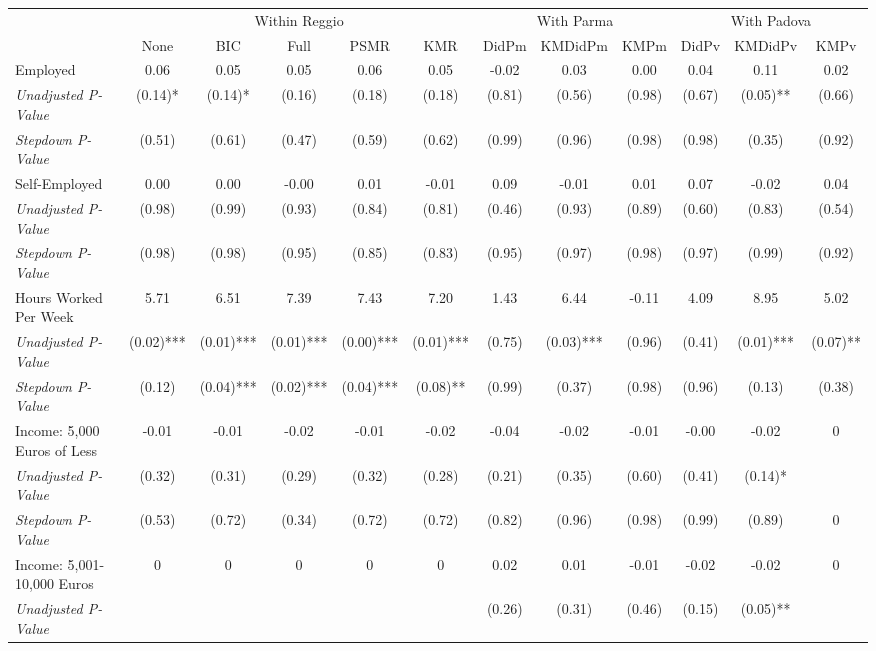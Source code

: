 \begin{tabular}{l c c c c c c c c c c c}
\toprule
& \multicolumn{5}{c}{Within Reggio} & \multicolumn{3}{c}{With Parma} & \multicolumn{3}{c}{With Padova} \\\cmidrule(lr){2-6} \cmidrule(lr){7-9} \cmidrule(lr){10-12}
 & None & BIC & Full & PSMR & KMR & DidPm & KMDidPm & KMPm & DidPv & KMDidPv & KMPv \\
\midrule
Employed & 0.06 & 0.05 & 0.05 & 0.06 & 0.05 & -0.02 & 0.03 & 0.00 & 0.04 & 0.11 & 0.02 \\
\quad \textit{Unadjusted P-Value} & (0.14)* & (0.14)* & (0.16) & (0.18) & (0.18) & (0.81) & (0.56) & (0.98) & (0.67) & (0.05)** & (0.66) \\
\quad \textit{Stepdown P-Value} & (0.51) & (0.61) & (0.47) & (0.59) & (0.62) & (0.99) & (0.96) & (0.98) & (0.98) & (0.35) & (0.92) \\
Self-Employed & 0.00 & 0.00 & -0.00 & 0.01 & -0.01 & 0.09 & -0.01 & 0.01 & 0.07 & -0.02 & 0.04 \\
\quad \textit{Unadjusted P-Value} & (0.98) & (0.99) & (0.93) & (0.84) & (0.81) & (0.46) & (0.93) & (0.89) & (0.60) & (0.83) & (0.54) \\
\quad \textit{Stepdown P-Value} & (0.98) & (0.98) & (0.95) & (0.85) & (0.83) & (0.95) & (0.97) & (0.98) & (0.97) & (0.99) & (0.92) \\
Hours Worked Per Week & 5.71 & 6.51 & 7.39 & 7.43 & 7.20 & 1.43 & 6.44 & -0.11 & 4.09 & 8.95 & 5.02 \\
\quad \textit{Unadjusted P-Value} & (0.02)*** & (0.01)*** & (0.01)*** & (0.00)*** & (0.01)*** & (0.75) & (0.03)*** & (0.96) & (0.41) & (0.01)*** & (0.07)** \\
\quad \textit{Stepdown P-Value} & (0.12) & (0.04)*** & (0.02)*** & (0.04)*** & (0.08)** & (0.99) & (0.37) & (0.98) & (0.96) & (0.13) & (0.38) \\
Income: 5,000 Euros of Less & -0.01 & -0.01 & -0.02 & -0.01 & -0.02 & -0.04 & -0.02 & -0.01 & -0.00 & -0.02 & 0 \\
\quad \textit{Unadjusted P-Value} & (0.32) & (0.31) & (0.29) & (0.32) & (0.28) & (0.21) & (0.35) & (0.60) & (0.41) & (0.14)* & \\
\quad \textit{Stepdown P-Value} & (0.53) & (0.72) & (0.34) & (0.72) & (0.72) & (0.82) & (0.96) & (0.98) & (0.99) & (0.89) & 0 \\
Income: 5,001-10,000 Euros & 0 & 0 & 0 & 0 & 0 & 0.02 & 0.01 & -0.01 & -0.02 & -0.02 & 0 \\
\quad \textit{Unadjusted P-Value} & & & & & & (0.26) & (0.31) & (0.46) & (0.15) & (0.05)** & \\

\end{tabular}

